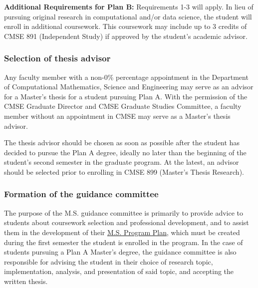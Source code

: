 \vspace{3mm}
\noindent
\textbf{Additional Requirements for Plan B:} Requirements 1-3 will
apply. In lieu of pursuing original research in computational and/or
data science, the student will enroll in additional coursework. This
coursework may include up to 3 credits of CMSE 891 (Independent Study)
if approved by the student's academic advisor. 


\subsubsection{Selection of thesis advisor}

Any faculty member with a non-0\% percentage appointment in the
Department of Computational Mathematics, Science and Engineering may
serve as an advisor for a Master's thesis for a student pursuing Plan
A.  With the permission of the CMSE Graduate Director and CMSE
Graduate Studies Committee, a faculty member without an appointment in
CMSE may serve as a Master's thesis advisor.  

The thesis advisor should be
chosen as soon as possible after the student has decided to pursue the
Plan A degree,  ideally no later than the beginning of the student's second
semester in the graduate program.  At the latest, an advisor should be selected prior to
enrolling in CMSE 899 (Master's Thesis Research).  


\subsubsection{Formation of the guidance committee}
\label{sec:ms_guidance_comm}

The purpose of the M.S. guidance committee is primarily to provide
advice to students about coursework selection and professional
development, and to assist them in the development of their
\href{https://www.egr.msu.edu/grs/}{M.S. Program Plan}, which must be
created during the first semester the student is enrolled in the
program.  In the case of students pursuing a Plan A Master's degree,
the guidance committee is also responsible for advising the student in
their choice of research topic, implementation, analysis, and
presentation of said topic, and accepting the written thesis.

